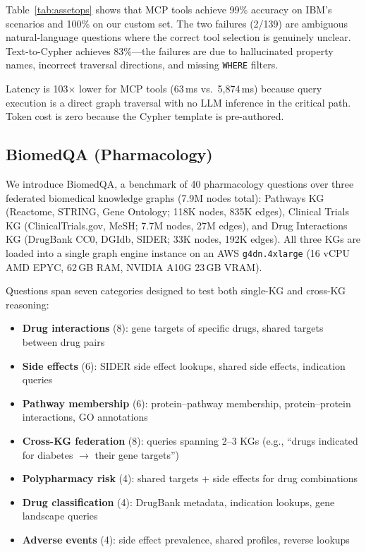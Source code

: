 \documentclass[sigconf, anonymous, review]{acmart}
\begin{document}
Table~\ref{tab:assetops} shows that MCP tools achieve 99\% accuracy
on IBM's scenarios and 100\% on our custom set.
The two failures (2/139) are ambiguous natural-language questions
where the correct tool selection is genuinely unclear.
Text-to-Cypher achieves 83\%---the failures are due to hallucinated
property names, incorrect traversal directions, and missing
\texttt{WHERE} filters.

Latency is 103$\times$ lower for MCP tools (63\,ms vs.\ 5,874\,ms)
because query execution is a direct graph traversal with no
LLM inference in the critical path.  Token cost is zero because
the Cypher template is pre-authored.

\subsection{BiomedQA (Pharmacology)}

We introduce BiomedQA, a benchmark of 40 pharmacology questions
over three federated biomedical knowledge graphs (7.9M nodes
total): Pathways KG (Reactome, STRING, Gene Ontology;
118K nodes, 835K edges), Clinical Trials KG
(ClinicalTrials.gov, MeSH; 7.7M nodes, 27M edges), and
Drug Interactions KG (DrugBank CC0, DGIdb, SIDER;
33K nodes, 192K edges).  All three KGs are loaded into a
single graph engine instance on an AWS \texttt{g4dn.4xlarge}
(16 vCPU AMD EPYC, 62\,GB RAM, NVIDIA A10G 23\,GB VRAM).

Questions span seven categories designed to test both
single-KG and cross-KG reasoning:

\begin{itemize}[leftmargin=*,nosep]
\item \textbf{Drug interactions} (8): gene targets of specific drugs,
  shared targets between drug pairs
\item \textbf{Side effects} (6): SIDER side effect lookups,
  shared side effects, indication queries
\item \textbf{Pathway membership} (6): protein--pathway membership,
  protein--protein interactions, GO annotations
\item \textbf{Cross-KG federation} (8): queries spanning 2--3 KGs
  (e.g., ``drugs indicated for diabetes $\to$ their gene targets'')
\item \textbf{Polypharmacy risk} (4): shared targets + side effects
  for drug combinations
\item \textbf{Drug classification} (4): DrugBank metadata,
  indication lookups, gene landscape queries
\item \textbf{Adverse events} (4): side effect prevalence,
  shared profiles, reverse lookups
\end{itemize}
\end{document}
